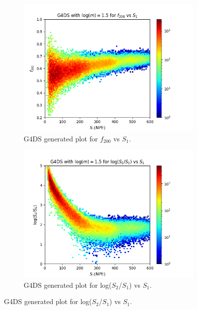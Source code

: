 \documentclass[11pt]{article} %
\begin{document}
\begin{figure}[H]
\centering
\begin{minipage}{\textwidth}
  \begin{subfigure}{.5\textwidth}
      \centering\captionsetup{width=.9\linewidth}%
      \includegraphics[scale=0.6]{./images/1.5/g4_f200_vs_s1.png}
      \caption{G4DS generated plot for $f_{200}$ vs $S_1$.}
  \end{subfigure}
  \begin{subfigure}{.5\textwidth}
      \centering\captionsetup{width=.9\linewidth}%
      \includegraphics[scale=0.6]{./images/1.5/g4_s1_over_s2_vs_s1.png}
      \caption{G4DS generated plot for log($S_2$/$S_1$) vs $S_1$.}
  \end{subfigure}

\end{minipage}
\end{figure}
\end{document}
